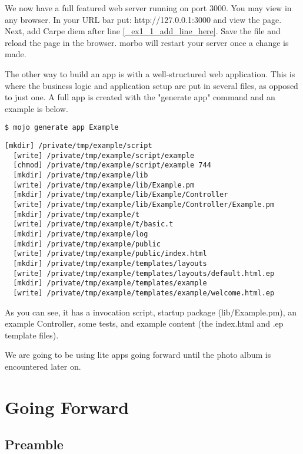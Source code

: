 \documentclass[17pt]{extreport}
\begin{document}
We now have a full featured web server running on port 3000. You may view in
any browser. In your URL bar put: http://127.0.0.1:3000 and view the page.
Next, add Carpe diem after line \ref{_ex1_1_add_line_here}. Save the file and reload
the page in the browser. morbo will restart your server once a change is made.

The other way to build an app is with a well-structured web application. This
is where the business logic and application setup are put in several files, as
opposed to just one.  A full app is created with the "generate app" command and
an example is below.

\begin{lstlisting}[style=BashInputStyle]
$ mojo generate app Example           
\end{lstlisting}

\begin{lstlisting}[style=BashOutputStyle]
  [mkdir] /private/tmp/example/script
  [write] /private/tmp/example/script/example
  [chmod] /private/tmp/example/script/example 744
  [mkdir] /private/tmp/example/lib
  [write] /private/tmp/example/lib/Example.pm
  [mkdir] /private/tmp/example/lib/Example/Controller
  [write] /private/tmp/example/lib/Example/Controller/Example.pm
  [mkdir] /private/tmp/example/t
  [write] /private/tmp/example/t/basic.t
  [mkdir] /private/tmp/example/log
  [mkdir] /private/tmp/example/public
  [write] /private/tmp/example/public/index.html
  [mkdir] /private/tmp/example/templates/layouts
  [write] /private/tmp/example/templates/layouts/default.html.ep
  [mkdir] /private/tmp/example/templates/example
  [write] /private/tmp/example/templates/example/welcome.html.ep
\end{lstlisting}

As you can see, it has a invocation script, startup package (lib/Example.pm),
an example Controller, some tests, and example content (the index.html and .ep
template files).

We are going to be using lite apps going forward until the photo album is
encountered later on.

\chapter*{Going Forward}

\section{Preamble}
\end{document}
